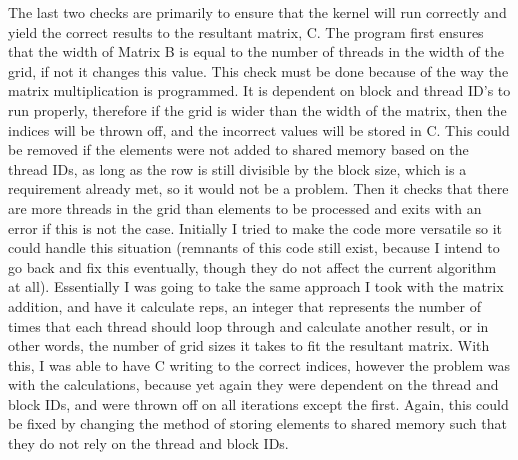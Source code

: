 \documentclass[8pt]{article}
\begin{document}
The last two checks are primarily to ensure that the kernel will run correctly and yield the correct results to the resultant matrix, C.  The program first ensures that the width of Matrix B is equal to the number of threads in the width of the grid, if not it changes this value.  This check must be done because of the way the matrix multiplication is programmed.  It is dependent on block and thread ID's to run properly, therefore if the grid is wider than the width of the matrix, then the indices will be thrown off, and the incorrect values will be stored in C.  This could be removed if the elements were not added to shared memory based on the thread IDs, as long as the row is still divisible by the block size, which is a requirement already met, so it would not be a problem.  Then it checks that there are more threads in the grid than elements to be processed and exits with an error if this is not the case.  Initially I tried to make the code more versatile so it could handle this situation (remnants of this code still exist, because I intend to go back and fix this eventually, though they do not affect the current algorithm at all).  Essentially I was going to take the same approach I took with the matrix addition, and have it calculate reps, an integer that represents the number of times that each thread should loop through and calculate another result, or in other words, the number of grid sizes it takes to fit the resultant matrix.  With this, I was able to have C writing to the correct indices, however the problem was with the calculations, because yet again they were dependent on the thread and block IDs, and were thrown off on all iterations except the first.  Again, this could be fixed by changing the method of storing elements to shared memory such that they do not rely on the thread and block IDs.\\
\end{document}
